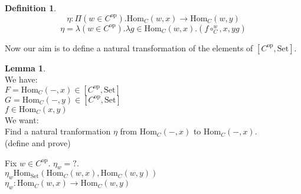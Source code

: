 \documentclass[10pt,a4paper]{article}
\theoremstyle{definition}
\newtheorem{definition}{Definition}[section]
\newtheorem{lemma}{Lemma}[section]
\newcommand{\Hom}{{\textrm{Hom}}}
\newcommand{\op}{{\textrm{op}}}
\newcommand{\Set}{{\textrm{Set}}}
\begin{document}
\begin{definition}
$$\eta : \Pi(w\in C^\op).\Hom_C(w,x)\to \Hom_C(w,y)$$
$$\eta = \lambda (w\in C^\op). \lambda g\in\Hom_C(w,x).(f\circ_C^w,x,y g)$$
\end{definition}
Now our aim is to define a natural transformation of the elements of $[C^\op,\Set]$.\\
\begin{lemma}$\textrm{ }$\\
We have:\\
$F=\Hom_C(-,x)\in [C^\op,\Set]$\\
$G=\Hom_C(-,y)\in [C^\op,\Set]$\\
$f\in\Hom_C(x,y)$\\
We want:\\
Find a natural tranformation $\eta$ from $\Hom_C(-,x)$ to $\Hom_C(-,x)$.\\ (define and prove)\\
\end{lemma}
Fix $w\in C^\op$. $\eta_w = ?$.\\
$\eta_w\Hom_\Set(\Hom_C(w,x),\Hom_C(w,y))$\\
$\eta_w: \Hom_C(w,x)\to \Hom_C(w,y)$\\
\end{document}
